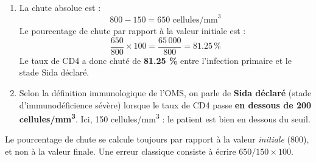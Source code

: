 \documentclass[11pt]{article}
\begin{document}
\begin{corrige}
\begin{enumerate}
    \item La chute absolue est :
    \[ 800 - 150 = 650 \text{ cellules/mm}^3 \]
    Le pourcentage de chute par rapport à la valeur initiale est :
    \[ \frac{650}{800} \times 100 = \frac{65\,000}{800} = \num{81,25}\,\% \]
    Le taux de CD4 a donc chuté de \textbf{\num{81,25} \%} entre l'infection primaire et le stade Sida déclaré.
    \item Selon la définition immunologique de l'OMS, on parle de \textbf{Sida déclaré} (stade d'immunodéficience sévère) lorsque le taux de CD4 passe \textbf{en dessous de 200 cellules/mm\textsuperscript{3}}. Ici, 150 cellules/mm\textsuperscript{3} : le patient est bien en dessous du seuil.
\end{enumerate}
\begin{attention}
Le pourcentage de chute se calcule toujours par rapport à la valeur \emph{initiale} (800), et non à la valeur finale. Une erreur classique consiste à écrire $650/150 \times 100$.
\end{attention}
\end{corrige}
\end{document}
